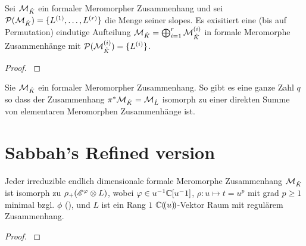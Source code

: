 \begin{thm}
  \cite[Thm 5.3.1]{sabbah_cimpa90}
  Sei $\mathcal{M}_{\hat{K}}$ ein formaler Meromorpher Zusammenhang und sei
  $\mathcal{P}(\mathcal{M}_{\hat K})=\{L^{(1)},\dots,L^{(r)}\}$ die Menge seiner slopes. Es
  exisitiert eine (bis auf Permutation) eindutige Aufteilung $\mathcal{M}_{\hat
  K}=\bigoplus_{i=1}^r\mathcal{M}_{\hat K}^{(i)}$ in formale Meromorphe Zusammenhänge
  mit $\mathcal{P}(\mathcal{M}_{\hat K}^{(i)})=\{L^{(i)}\}$.
\end{thm}
\begin{proof}
  \cite[Thm 5.3.1]{sabbah_cimpa90}
\end{proof}
\begin{comment}
  Aussagen, die aus dem Beweis entstehen:\\
  Wir erhalten die Exacte Sequenz
  \[
    0 \rightarrow \cD_{\hat K}/\cD_{\hat K} \cdot P_1
    \rightarrow \cD_{\hat K}/\cD_{\hat K} \cdot P
    \rightarrow \cD_{\hat K}/\cD_{\hat K} \cdot P_2
    \rightarrow 0
  \]
  \begin{cor}
    \cite[Thm 5.3.4]{sabbah_cimpa90}
    $\cP(P)=\cP(P_1)\cup\cP(P_2)$ und $\cP(P_1)\cap\cP(P_2)=\emptyset$
  \end{cor}
\end{comment}
\begin{comment}
  \cite[Page 34]{sabbah_cimpa90}
  Sei $\cM_{\hat K}$ ein formaler Meromorpher Zusammenhang. Man definiert
  $\pi^*\cM_{\hat K}$ als den Vektor Raum über $\hat L:\pi^*\cM_{\hat K}=\hat
  L\otimes_{\hat K}\cM_{\hat K}$. Dann definiert man die Wirkung von
  $\partial_t$ durch: $t\partial:t\cdot(1\otimes
  m)=q(1\otimes(x\partial_x\otimes m))$ und damit
  \[
    t\partial_t\cdot(\phi\otimes m)=q(\phi\otimes(x\partial_x\cdot
    m))+((t\frac{\partial\phi}{\partial t})\otimes m) \,.
  \]
\end{comment}
\begin{thm}
  \cite[Thm 5.4.7]{sabbah_cimpa90}
  Sie $\mathcal{M}_{\hat K}$ ein formaler Meromorpher Zusammenhang. So gibt es eine
  ganze Zahl $q$ so dass der Zusammenhang $\pi^*\mathcal{M}_{\hat K}=\mathcal{M}_{\hat L}$
  isomorph zu einer direkten Summe von elementaren Meromorphen Zusammenhänge
  ist.
\end{thm}

\section{Sabbah's Refined version}



\begin{prop}
  \cite[Prop 3.1]{sabbah_Fourier-local}
  Jeder irreduzible endlich dimensionale formale Meromorphe Zusammenhang
  $\mathcal{M}_{\hat K}$ ist isomorph zu $\rho_+(\mathscr{E}^\varphi\otimes L)$, wobei $\varphi\in
  u^{-1}\mathbb{C}[u^-1]$, $\rho:u\mapsto t=u^p$ mit grad $p\geq1$ minimal bzgl. $\phi$
  (\cite[Rem 2.8]{sabbah_Fourier-local}), und $L$ ist ein Rang $1$
  ${\mathbb C (\!(u)\!)}$-Vektor Raum mit regulärem Zusammenhang.
\end{prop}
\begin{proof}
  \cite[Prop 3.1]{sabbah_Fourier-local}
\end{proof}

